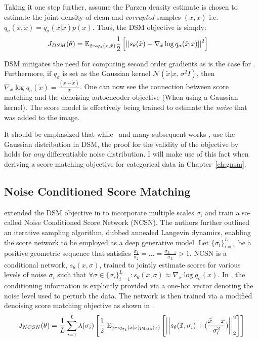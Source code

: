 Taking it one step further, assume the Parzen density estimate is chosen to estimate the joint density of clean and \textit{corrupted} samples $(x, \tilde{x})$ i.e. $q_{\sigma}(x, \tilde{x}) = q_{\sigma}(x | \tilde{x} ) p(x) $. Thus, the DSM objective is simply:
\begin{align}
\label{eq:denoising_sm}
    J_{DSM}(\theta) &= \mathbb{E}_{\tilde{x}\sim q_{\sigma}(x, \tilde{x})} \frac{1}{2} \left[ { \left|\left| {s_\theta(\tilde{x}) - \nabla_{\tilde{x}} \log q_{\sigma}(\tilde{x} | x ) } \right|\right|^2 } \right]
\end{align}

DSM mitigates the need for computing second order gradients as is the case for . Furthermore, if $q_{\sigma}$ is set as the Gaussian kernel $\mathcal{N}(\tilde{x} |  x,\,\sigma^{2}I)$, then $\nabla_x \log q_{\sigma}(\tilde{x}) = \frac{(x - \tilde{x})}{\sigma}$. One can now see the connection between score matching and the denoising autoencoder objective (When using a Gaussian kernel). The score model is effectively being trained to estimate the \textit{noise} that was added to the image.

It should be emphasized that while~\cite{vincent2011connection} and many subsequent works \cite{Song2019,song2020improved,song2020score}, use the Gaussian distribution in DSM, the proof for the validity of the objective by~\cite{vincent2011connection} holds for \textit{any} differentiable noise distribution.
I will make use of this fact when deriving a score matching objective for categorical data in Chapter~\ref{ch:gnsm}.

\subsection*{Noise Conditioned Score Matching}
\label{NCSM}

\cite{Song2019} extended the DSM objective in  to incorporate multiple scales $\sigma$, and train a so-called Noise Conditioned Score Network (NCSN). The authors further outlined an iterative sampling algorithm, dubbed annealed Langevin dynamics, enabling the score network to be employed as a deep generative model. Let $\{\sigma_i\}_{i=1}^L$ be a positive geometric sequence that satisfies $\frac{\sigma_1}{\sigma_2} = ... = \frac{\sigma_{L-1}}{\sigma_{L}} >  1$. NCSN is a conditional network, $s_{\theta}(x,\sigma)$, trained to jointly estimate scores for various levels of noise $\sigma_i$ such that $\forall \sigma \in \{\sigma_i\}_{i=1}^L: s_{\theta}(x,\sigma) \approx \nabla_x \log q_{\sigma}(x)$. In \cite{Song2019}, the conditioning information is explicitly provided via a one-hot vector denoting the noise level used to perturb the data. The network is then trained via a modified denoising score matching objective as shown in .
\begin{equation}
\label{eq:ncsn_dsm}
J_{NCSN}(\theta) = \frac{1}{L} \sum_{i=1}^L \lambda(\sigma_i)
\left[ {\frac{1}{2} \displaystyle \text{~} \mathbb{E}_{\tilde{x}\sim q_{\sigma_i} (\tilde{x}|x) p_{\text{data}}(x)} \left[ { \left|\left| { s_{\theta}(\tilde{x}, \sigma_i) + (\frac{\tilde{x} - x}{\sigma_i^2}) } \right|\right|^2_2  } \right] } \right]
\end{equation}

